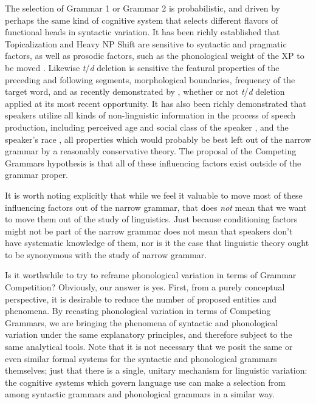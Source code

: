 The selection of Grammar 1 or Grammar 2 is probabilistic, and driven by perhaps the same kind of cognitive system that selects different flavors of functional heads in syntactic variation.
It has been richly established that Topicalization and Heavy NP Shift are sensitive to syntactic and pragmatic factors, as well as prosodic factors, such as the phonological weight of the XP to be moved \citep[e.g.][]{arnoldetal2000, speyer2008, speyer2010, wallenberg2012}. %
Likewise {\sl t}/{\sl d} deletion is sensitive the featural properties of the preceding and following segments, morphological boundaries, frequency of the target word, and as recently demonstrated by \citet{MacKenzie.Tamminga2012}, whether or not {\sl t}/{\sl d} deletion applied at its most recent opportunity.
It has also been richly demonstrated that speakers utilize all kinds of non-linguistic information in the process of speech production, including perceived age and social class of the speaker \citep{Hay2006}, and the speaker's race \citep{StaumCasasanto2010}, all properties which would probably be best left out of the narrow grammar by a reasonably conservative theory.
The proposal of the Competing Grammars hypothesis is that all of these influencing factors exist outside of the grammar proper.

It is worth noting explicitly that while we feel it valuable to move most of these influencing factors out of the narrow grammar, that does \emph{not} mean that we want to move them out of the study of linguistics. Just because conditioning factors might not be part of the narrow grammar does not mean that speakers don't have systematic knowledge of them, nor is it the case that linguistic theory ought to be synonymous with the study of narrow grammar.
 
Is it worthwhile to try to reframe phonological variation in terms of Grammar Competition?
Obviously, our answer is yes.
First, from a purely conceptual perspective, it is desirable to reduce the number of proposed entities and phenomena.
By recasting phonological variation in terms of Competing Grammars, we are bringing the phenomena of syntactic and phonological variation under the same explanatory principles, and therefore subject to the same analytical tools.
Note that it is not necessary that we posit the same or even similar formal systems for the syntactic and phonological grammars themselves; just that there is a single, unitary mechanism for linguistic variation: the cognitive systems which govern language use can make a selection from among syntactic grammars and phonological grammars in a similar way.






